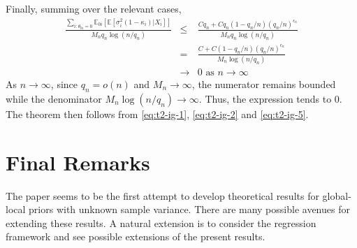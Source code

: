 \documentclass[sn-basic]{sn-jnl}%
\theoremstyle{thmstyleone}%
\begin{document}
\noindent
Finally, summing over the relevant cases,
\begin{eqnarray}
\frac{\sum_{i:\theta_{0i}=0} \mathbb{E}_{0i}[\mathbb{E}[\sigma_{i}^2(1-\kappa_i)|X_i]]}{M_n q_n \log(n/q_n)}
&\leq&
\frac{C q_n + C q_n (1-q_n/n) (q_n/n)^{\epsilon_n}}{M_n q_n \log (n/q_n)} \nonumber \\
&=&  \frac{C + C (1-q_n/n) (q_n/n)^{\epsilon_n}}{M_n \log (n/q_n)} \nonumber \\
&\to& 0 \text{ as } n \to \infty
\label{eq:t2-ig-5}
\end{eqnarray}
As $n \to \infty$, since $q_n = o(n)$ and $M_n \to \infty$, the numerator remains bounded while the denominator $M_n \log(n/q_n) \to \infty$. Thus, the expression tends to $0$.\\
\noindent
The theorem then follows from \eqref{eq:t2-ig-1}, \eqref{eq:t2-ig-2} and \eqref{eq:t2-ig-5}.

\section{Final Remarks}\label{sec:remarks}

\noindent
The paper seems to be the first attempt to develop theoretical results for
global-local priors with unknown sample variance. 
There are many possible avenues for extending these results. 
A natural extension is to consider the regression framework and see possible extensions of the present 
results.\\


\backmatter


\end{document}

